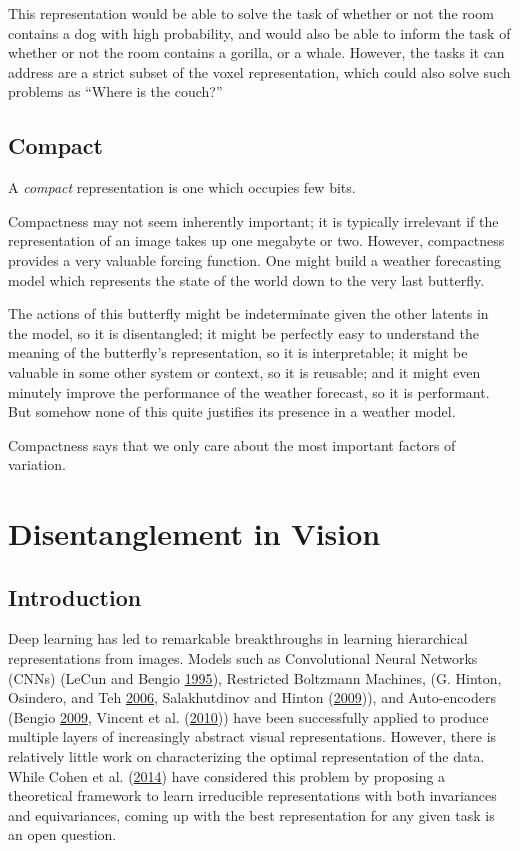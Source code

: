 \documentclass[12pt,twoside]{mitthesis}
\begin{document}
This representation would be able to solve the task of whether or not
the room contains a dog with high probability, and would also be able to
inform the task of whether or not the room contains a gorilla, or a
whale. However, the tasks it can address are a strict subset of the
voxel representation, which could also solve such problems as ``Where is
the couch?''

\section{Compact}\label{compact}

A \emph{compact} representation is one which occupies few bits.

Compactness may not seem inherently important; it is typically
irrelevant if the representation of an image takes up one megabyte or
two. However, compactness provides a very valuable forcing function. One
might build a weather forecasting model which represents the state of
the world down to the very last butterfly.

The actions of this butterfly might be indeterminate given the other
latents in the model, so it is disentangled; it might be perfectly easy
to understand the meaning of the butterfly's representation, so it is
interpretable; it might be valuable in some other system or context, so
it is reusable; and it might even minutely improve the performance of
the weather forecast, so it is performant. But somehow none of this
quite justifies its presence in a weather model.

Compactness says that we only care about the most important factors of
variation.

\chapter{Disentanglement in Vision}\label{disentanglement-in-vision}

\section{Introduction}\label{introduction-1}

Deep learning has led to remarkable breakthroughs in learning
hierarchical representations from images. Models such as Convolutional
Neural Networks (CNNs) (LeCun and Bengio
\protect\hyperlink{ref-lecun1995convolutional}{1995}), Restricted
Boltzmann Machines, (G. Hinton, Osindero, and Teh
\protect\hyperlink{ref-hinton2006fast}{2006}, Salakhutdinov and Hinton
(\protect\hyperlink{ref-salakhutdinov2009deep}{2009})), and
Auto-encoders (Bengio \protect\hyperlink{ref-bengio2009learning}{2009},
Vincent et al. (\protect\hyperlink{ref-vincent2010stacked}{2010})) have
been successfully applied to produce multiple layers of increasingly
abstract visual representations. However, there is relatively little
work on characterizing the optimal representation of the data. While
Cohen et al. (\protect\hyperlink{ref-cohen2014learning}{2014}) have
considered this problem by proposing a theoretical framework to learn
irreducible representations with both invariances and equivariances,
coming up with the best representation for any given task is an open
question.
\end{document}
